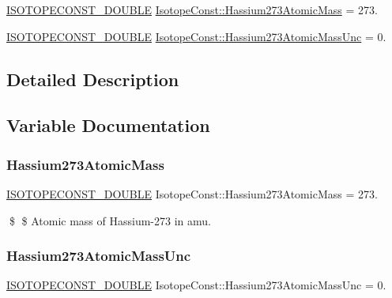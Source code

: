 \begin{DoxyCompactItemize}
\item 
\mbox{\hyperlink{group___isotope_const-_macros_ga8f45a7272ce02c0b4c65c44636ed719a}{I\+S\+O\+T\+O\+P\+E\+C\+O\+N\+S\+T\+\_\+\+D\+O\+U\+B\+LE}} \mbox{\hyperlink{group___isotope_const-_hassium-_hs273_gae7ff6c4dce993a7992190a74088c8e76}{Isotope\+Const\+::\+Hassium273\+Atomic\+Mass}} = 273.
\item 
\mbox{\hyperlink{group___isotope_const-_macros_ga8f45a7272ce02c0b4c65c44636ed719a}{I\+S\+O\+T\+O\+P\+E\+C\+O\+N\+S\+T\+\_\+\+D\+O\+U\+B\+LE}} \mbox{\hyperlink{group___isotope_const-_hassium-_hs273_ga8221afded0117d36f0e836dc9c2754e2}{Isotope\+Const\+::\+Hassium273\+Atomic\+Mass\+Unc}} = 0.
\end{DoxyCompactItemize}


\subsection{Detailed Description}


\subsection{Variable Documentation}
\mbox{\label{group___isotope_const-_hassium-_hs273_gae7ff6c4dce993a7992190a74088c8e76}} 
\subsubsection{\texorpdfstring{Hassium273\+Atomic\+Mass}{Hassium273AtomicMass}}
{\footnotesize\ttfamily \mbox{\hyperlink{group___isotope_const-_macros_ga8f45a7272ce02c0b4c65c44636ed719a}{I\+S\+O\+T\+O\+P\+E\+C\+O\+N\+S\+T\+\_\+\+D\+O\+U\+B\+LE}} Isotope\+Const\+::\+Hassium273\+Atomic\+Mass = 273.}

\$ \$ Atomic mass of Hassium-\/273 in amu. \mbox{\label{group___isotope_const-_hassium-_hs273_ga8221afded0117d36f0e836dc9c2754e2}} 
\subsubsection{\texorpdfstring{Hassium273\+Atomic\+Mass\+Unc}{Hassium273AtomicMassUnc}}
{\footnotesize\ttfamily \mbox{\hyperlink{group___isotope_const-_macros_ga8f45a7272ce02c0b4c65c44636ed719a}{I\+S\+O\+T\+O\+P\+E\+C\+O\+N\+S\+T\+\_\+\+D\+O\+U\+B\+LE}} Isotope\+Const\+::\+Hassium273\+Atomic\+Mass\+Unc = 0.}


